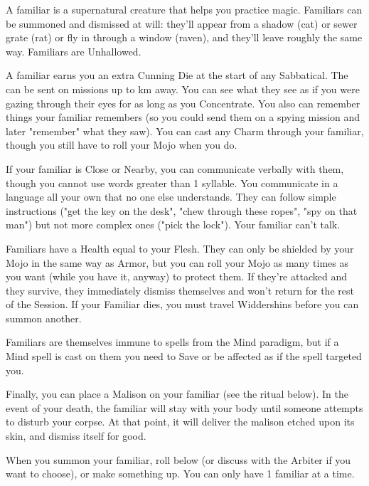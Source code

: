 {\OCCULT[
  Name=Bind Familiar,
  Link=occultism-bind-familiar,
  Success=1,
  Cost=666,
  Widdershins=1
]


A familiar is a supernatural creature that helps you practice magic.  Familiars can be summoned and dismissed at will: they'll appear from a shadow (cat) or sewer grate (rat) or fly in through a window (raven), and they'll leave roughly the same way.  Familiars are Unhallowed.

A familiar earns you an extra Cunning Die at the start of any Sabbatical.  The can be sent on missions up to \LVL km away.  You can see what they see as if you were gazing through their eyes for as long as you Concentrate. You also can remember things your familiar remembers (so you could send them on a spying mission and later "remember" what they saw). You can cast any Charm through your familiar, though you still have to roll your Mojo when you do.  

If your familiar is Close or Nearby, you can communicate verbally with them, though you cannot use words greater than 1 syllable.  You communicate in a language all your own that no one else understands.  They can follow simple instructions ("get the key on the desk", "chew through these ropes", "spy on that man") but not more complex ones ("pick the lock").  Your familiar can't talk.

Familiars have a Health equal to your Flesh.  They can only be shielded by your Mojo in the same way as Armor, but you can roll your Mojo as many times as you want (while you have it, anyway) to protect them.  If they're attacked and they survive, they immediately dismiss themselves and won't return for the rest of the Session. If your Familiar dies, you must travel Widdershins before you can summon another.  

Familiars are themselves immune to spells from the Mind paradigm, but if a Mind spell is cast on them you need to Save or be affected as if the spell targeted you.

Finally,  you can place a Malison on your familiar (see the ritual below).  In the event of your death, the familiar will stay with your body until someone attempts to disturb your corpse.  At that point, it will deliver the malison etched upon its skin, and dismiss itself for good.

When you summon your familiar, roll below (or discuss with the Arbiter if you want to choose), or make something up.  You can only have 1 familiar at a time.



}
